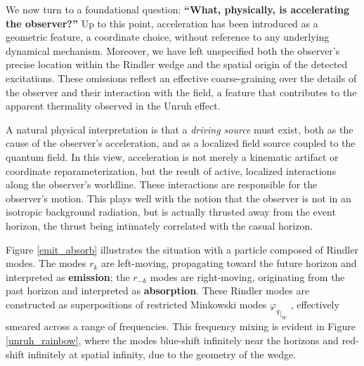 \documentclass[12pt,a4paper]{article}
\begin{document}
We now turn to a foundational question: {\bf ``What, physically, is accelerating the observer?''} Up to this point, acceleration has been introduced as a geometric feature, a coordinate choice, without reference to any underlying dynamical mechanism. Moreover, we have left unspecified both the observer’s precise location within the Rindler wedge and the spatial origin of the detected excitations. These omissions reflect an effective coarse-graining over the details of the observer and their interaction with the field, a feature that contributes to the apparent thermality observed in the Unruh effect.

A natural physical interpretation is that a {\it driving source} must exist, both as the cause of the observer’s acceleration, and as a localized field source coupled to the quantum field. In this view, acceleration is not merely a kinematic artifact or coordinate reparameterization, but the result of active, localized interactions along the observer’s worldline. These interactions are responsible for the observer’s motion.  This plays well with the notion that the observer is not in an isotropic background radiation, but is actually thrusted away from the event horizon, the thrust being intimately correlated with the casual horizon.

Figure \ref{emit_absorb} illustrates the situation with a particle composed of Rindler modes. The modes $r_k$ are left-moving, propagating toward the future horizon and interpreted as {\bf emission}; the $r_{-k}$ modes are right-moving, originating from the past horizon and interpreted as {\bf absorption}. These Rindler modes are constructed as superpositions of restricted Minkowski modes ${\varphi_q}_{|_W}$ , effectively smeared across a range of frequencies.  This frequency mixing is evident in Figure \ref{unruh_rainbow}, where the modes blue-shift infinitely near the horizons and red-shift infinitely at spatial infinity, due to the geometry of the wedge.
\end{document}
